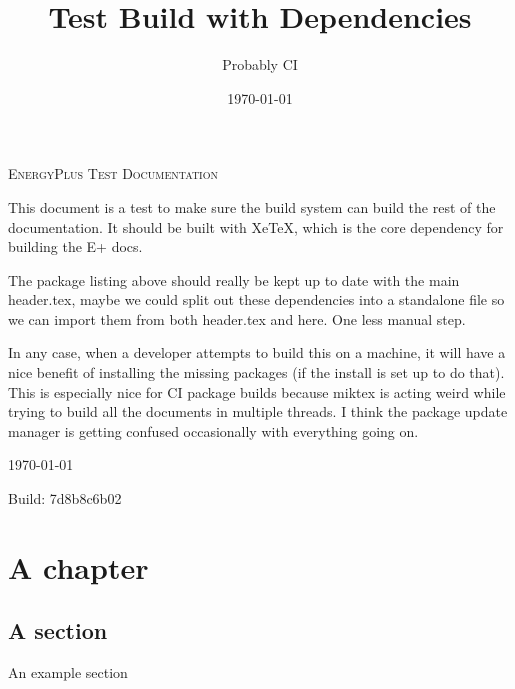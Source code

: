 \documentclass{report}
\title{Test Build with Dependencies}
\author{Probably CI}
\date{\today}
\begin{document}
\makeatletter
\begin{titlepage}
  \begin{center}
    {\scshape\LARGE EnergyPlus\texttrademark{} Test Documentation \par}
    \vspace{1.5cm}
    {\bfseries\huge \@title \par}
    \vspace{1.5cm}
    {\Large\itshape \@author \par}
    \vspace{2.5cm}

    This document is a test to make sure the build system can build the rest of the documentation.
    It should be built with XeTeX, which is the core dependency for building the E+ docs.

    The package listing above should really be kept up to date with the main header.tex, maybe we could split out
    these dependencies into a standalone file so we can import them from both header.tex and here.
    One less manual step.

    In any case, when a developer attempts to build this on a machine, it will have a nice benefit of installing the missing packages (if the install is set up to do that).
    This is especially nice for CI package builds because miktex is acting weird while trying to build all the documents in multiple threads.
    I think the package update manager is getting confused occasionally with everything going on.
    \vfill



    {\large \today \par}
    \vspace{1.5cm}
    {\large Build: 7d8b8c6b02 \par}
  \end{center}
  {\small
  }
\end{titlepage}
\makeatother

{
\setcounter{tocdepth}{2}
\tableofcontents
}

\hypertarget{generated-toc}{}

\chapter{A chapter}\label{chapter-1}

\section{A section}\label{chapter-1-section-1}

An example section
\end{document}

